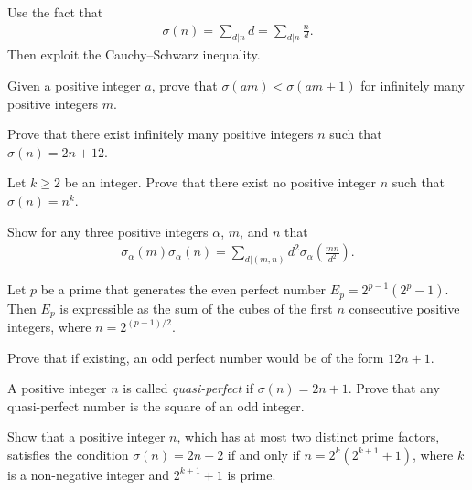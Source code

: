 \documentclass[12pt]{subfile}
\begin{document}
	\begin{hint}
		Use the fact that
			\begin{align*}
				\sigma(n)=\sum\limits_{d|n} d =  \sum\limits_{d|n} \frac{n}{d}.
			\end{align*}
		Then exploit the Cauchy--Schwarz inequality.
	\end{hint}

		\begin{problem}[Romania TST 2010] %
		Given a positive integer $a$, prove that $\sigma(am) < \sigma(am + 1)$ for infinitely many positive integers $m$.
	\end{problem}

	\begin{problem}
		Prove that there exist infinitely many positive integers $n$ such that $\sigma(n)=2n+12$.
	\end{problem}

	\begin{problem}
		Let $k\geq 2$ be an integer. Prove that there exist no positive integer $n$ such that $\sigma(n)=n^k$.
	\end{problem}

	\begin{problem}
		Show for any three positive integers $\alpha$, $m$, and $n$ that
			\begin{align*}
				\sigma_{\alpha} (m)\sigma_{\alpha} (n) = \sum_{d|(m,n)} d^2 \sigma_{\alpha} \left(\frac{mn}{d^2}\right).
			\end{align*}
	\end{problem}
	\begin{problem}%
		Let $p$ be a prime that generates the even perfect number $E_p=2^{p-1}(2^p-1)$. Then $E_p$ is expressible as the sum of the cubes of the first $n$ consecutive positive integers, where $n=2^{(p-1)/2}$.
	\end{problem}

	\begin{problem}
		Prove that if existing, an odd perfect number would be of the form $12n+1$.
	\end{problem}

	\begin{problem}[Putnam 1976]
		A positive integer $n$ is called \textit{quasi-perfect} if $\sigma(n)=2n+1$. Prove that any quasi-perfect number is the square of an odd integer.
	\end{problem}


	\begin{problem}
		Show that a positive integer $n$, which has at most two distinct prime factors, satisfies the condition $\sigma(n)=2n-2$ if and only if $n=2^k(2^{k+1}+1)$, where $k$ is a non-negative integer and $2^{k+1}+1$ is prime.
	\end{problem}
\end{document}
